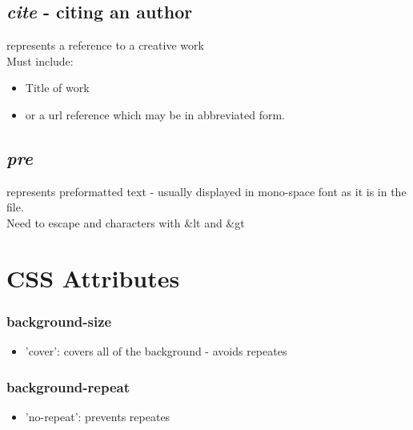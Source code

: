 \documentclass[]{article}
\newcommand{\<}{\guilsinglleft}
\renewcommand{\>}{\guilsinglright}
\renewcommand{\it}[1]{\textit{#1}}
\begin{document}
\subsection{\it{cite} - citing an author}
 represents a reference to a creative work
\\
Must include:
\begin{itemize}
	\item Title of work  
	\item or a url reference which may be in abbreviated form.
\end{itemize}

\subsection{\it{pre}}
represents preformatted text - usually displayed in mono-space font as it is in the file.
\\
Need to escape \< and \> characters with \&lt and \&gt


\section{CSS Attributes}
\subsubsection{background-size}
\begin{itemize}
	\item 'cover': covers all of the background - avoids repeates
\end{itemize}
\subsubsection{background-repeat}
\begin{itemize}
	\item 'no-repeat': prevents repeates
\end{itemize}
\end{document}
